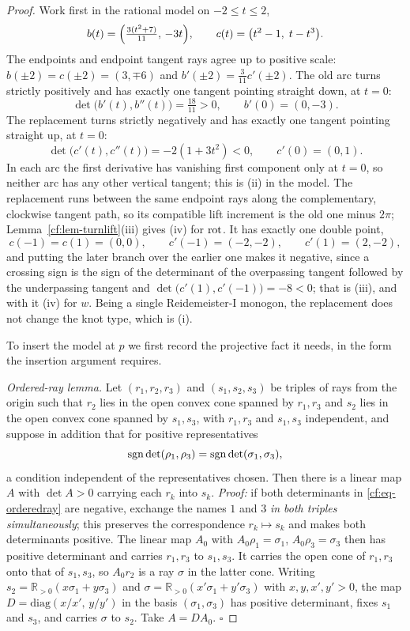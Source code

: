 \begin{proof}
Work first in the rational model on $-2\leq t\leq2$,
\[
b(t)=\Bigl(\tfrac{3(t^2+7)}{11},\,-3t\Bigr),\qquad
c(t)=\bigl(t^2-1,\;t-t^3\bigr).
\]
The endpoints and endpoint tangent rays agree up to positive scale:
$b(\pm2)=c(\pm2)=(3,\mp6)$ and $b'(\pm2)=\frac3{11}c'(\pm2)$. The old arc turns
strictly positively and has exactly one tangent pointing straight down, at
$t=0$:
\[
\det\bigl(b'(t),b''(t)\bigr)=\tfrac{18}{11}>0,\qquad b'(0)=(0,-3).
\]
The replacement turns strictly negatively and has exactly one tangent pointing
straight up, at $t=0$:
\[
\det\bigl(c'(t),c''(t)\bigr)=-2(1+3t^2)<0,\qquad c'(0)=(0,1).
\]
In each arc the first derivative has vanishing first component only at $t=0$, so
neither arc has any other vertical tangent; this is (ii) in the model. The
replacement runs between the same endpoint rays along the complementary,
clockwise tangent path, so its compatible lift increment is the old one minus
$2\pi$; Lemma~\ref{cf:lem-turnlift}(iii) gives (iv) for $\operatorname{rot}$. It has exactly one double point,
\[
c(-1)=c(1)=(0,0),\qquad c'(-1)=(-2,-2),\qquad c'(1)=(2,-2),
\]
and putting the later branch over the earlier one makes it negative, since a
crossing sign is the sign of the determinant of the overpassing tangent followed
by the underpassing tangent and
$\det\bigl(c'(1),c'(-1)\bigr)=-8<0$; that is (iii), and with it (iv) for $w$.
Being a single Reidemeister-I monogon, the replacement does not change the knot
type, which is (i).

To insert the model at $p$ we first record the projective fact it needs, in the
form the insertion argument requires.

\emph{Ordered-ray lemma.} Let $(r_1,r_2,r_3)$ and $(s_1,s_2,s_3)$ be triples of
rays from the origin such that $r_2$ lies in the open convex cone spanned by
$r_1,r_3$ and $s_2$ lies in the open convex cone spanned by $s_1,s_3$, with
$r_1,r_3$ and $s_1,s_3$ independent, and suppose in addition that for positive
representatives
\begin{equation}
   \operatorname{sgn}\det(\rho_1,\rho_3)=\operatorname{sgn}\det(\sigma_1,\sigma_3),
\label{cf:eq-orderedray}
\end{equation}
a condition independent of the representatives chosen. Then there is a linear
map $A$ with $\det A>0$ carrying each $r_k$ into $s_k$.
\emph{Proof:} if both determinants in \eqref{cf:eq-orderedray} are negative,
exchange the names $1$ and $3$ \emph{in both triples simultaneously}; this
preserves the correspondence $r_k\mapsto s_k$ and makes both determinants
positive. The linear map $A_0$ with $A_0\rho_1=\sigma_1$, $A_0\rho_3=\sigma_3$
then has positive determinant and carries $r_1,r_3$ to $s_1,s_3$. It carries the
open cone of $r_1,r_3$ onto that of $s_1,s_3$, so $A_0r_2$ is a ray $\sigma$ in
the latter cone. Writing $s_2=\mathbb R_{>0}(x\sigma_1+y\sigma_3)$ and
$\sigma=\mathbb R_{>0}(x'\sigma_1+y'\sigma_3)$ with $x,y,x',y'>0$, the map
$D=\mathrm{diag}(x/x',\,y/y')$ in the basis $(\sigma_1,\sigma_3)$ has positive
determinant, fixes $s_1$ and $s_3$, and carries $\sigma$ to $s_2$. Take
$A=DA_0$. $\square$


\end{proof}
